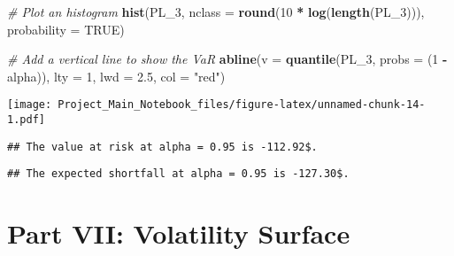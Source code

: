 \documentclass[]{article}
\newenvironment{Shaded}{\begin{snugshade}}{\end{snugshade}}
\newcommand{\CommentTok}[1]{\textcolor[rgb]{0.56,0.35,0.01}{\textit{#1}}}
\newcommand{\DataTypeTok}[1]{\textcolor[rgb]{0.13,0.29,0.53}{#1}}
\newcommand{\DecValTok}[1]{\textcolor[rgb]{0.00,0.00,0.81}{#1}}
\newcommand{\FloatTok}[1]{\textcolor[rgb]{0.00,0.00,0.81}{#1}}
\newcommand{\KeywordTok}[1]{\textcolor[rgb]{0.13,0.29,0.53}{\textbf{#1}}}
\newcommand{\NormalTok}[1]{#1}
\newcommand{\OperatorTok}[1]{\textcolor[rgb]{0.81,0.36,0.00}{\textbf{#1}}}
\newcommand{\OtherTok}[1]{\textcolor[rgb]{0.56,0.35,0.01}{#1}}
\newcommand{\StringTok}[1]{\textcolor[rgb]{0.31,0.60,0.02}{#1}}
\begin{document}
\begin{Shaded}
\begin{Highlighting}[]
\CommentTok{# Plot an histogram}
\KeywordTok{hist}\NormalTok{(PL_}\DecValTok{3}\NormalTok{, }\DataTypeTok{nclass =} \KeywordTok{round}\NormalTok{(}\DecValTok{10} \OperatorTok{*}\StringTok{ }\KeywordTok{log}\NormalTok{(}\KeywordTok{length}\NormalTok{(PL_}\DecValTok{3}\NormalTok{))), }\DataTypeTok{probability =} \OtherTok{TRUE}\NormalTok{)}

\CommentTok{# Add a vertical line to show the VaR}
\KeywordTok{abline}\NormalTok{(}\DataTypeTok{v   =} \KeywordTok{quantile}\NormalTok{(PL_}\DecValTok{3}\NormalTok{, }\DataTypeTok{probs =}\NormalTok{ (}\DecValTok{1} \OperatorTok{-}\StringTok{ }\NormalTok{alpha)),}
       \DataTypeTok{lty =} \DecValTok{1}\NormalTok{,}
       \DataTypeTok{lwd =} \FloatTok{2.5}\NormalTok{,}
       \DataTypeTok{col =} \StringTok{"red"}\NormalTok{)}
\end{Highlighting}
\end{Shaded}

\texttt{[image: Project\_Main\_Notebook\_files/figure-latex/unnamed-chunk-14-1.pdf]}

\begin{verbatim}
## The value at risk at alpha = 0.95 is -112.92$.
\end{verbatim}

\begin{verbatim}
## The expected shortfall at alpha = 0.95 is -127.30$.
\end{verbatim}

\hypertarget{part-vii-volatility-surface}{%
\section{Part VII: Volatility
Surface}\label{part-vii-volatility-surface}}
\end{document}
